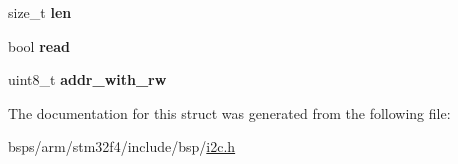 \begin{DoxyCompactItemize}
\item 
\mbox{\label{structstm32f4__i2c__bus__entry_a3678a368f50dd94785121ac92f30b89a}} 
size\+\_\+t {\bfseries len}
\item 
\mbox{\label{structstm32f4__i2c__bus__entry_a071a8858b4f1443fbfac2a698b865454}} 
bool {\bfseries read}
\item 
\mbox{\label{structstm32f4__i2c__bus__entry_a5e9643f5df5cd6392f4c7ca22e8751cf}} 
uint8\+\_\+t {\bfseries addr\+\_\+with\+\_\+rw}
\end{DoxyCompactItemize}


The documentation for this struct was generated from the following file\+:\begin{DoxyCompactItemize}
\item 
bsps/arm/stm32f4/include/bsp/\mbox{\hyperlink{bsps_2arm_2stm32f4_2include_2bsp_2i2c_8h}{i2c.\+h}}\end{DoxyCompactItemize}
